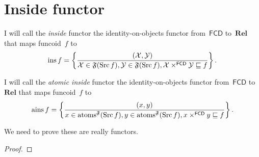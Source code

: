 \chapter{Inside functor}

\begin{defn}
I will call the \emph{inside} functor the identity-on-objects functor from~$\mathsf{FCD}$ to~$\mathbf{Rel}$ that maps
funcoid~$f$ to
\[
\operatorname{ins} f =
\left\{ \frac{(\mathcal{X},\mathcal{Y})}{\mathcal{X}\in\mathfrak{F}(\operatorname{Src} f), \mathcal{Y}\in\mathfrak{F}(\operatorname{Src} f), \mathcal{X}\times^{\mathsf{FCD}}\mathcal{Y}\sqsubseteq f}\right\}. \]
\end{defn}

\begin{defn}
I will call the \emph{atomic inside} functor the identity-on-objects functor from~$\mathsf{FCD}$ to~$\mathbf{Rel}$ that maps
funcoid~$f$ to
\[
\operatorname{ains} f =
\left\{ \frac{(x,y)}{x\in\operatorname{atoms}^{\mathfrak{F}}(\operatorname{Src} f), y\in\operatorname{atoms}^{\mathfrak{F}}(\operatorname{Src} f), x\times^{\mathsf{FCD}}y\sqsubseteq f}\right\}. \]
\end{defn}

We need to prove these are really functors.

\begin{proof}

\end{proof}